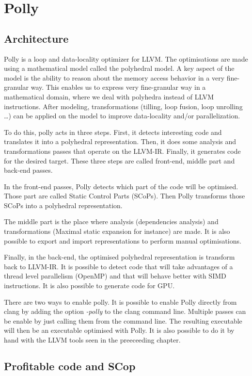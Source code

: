 \chapter{Polly}\label{ch:Polly}

\section{Architecture}
Polly is a loop and data-locality optimizer for LLVM. The optimisations are made using a mathematical model called the polyhedral model. A key aspect of the model is the ability to reason about the memory access behavior in a very fine-granular way. This enables us to express very fine-granular way in a mathematical domain, where we deal with polyhedra instead of LLVM instructions. After modeling, transformations (tilling, loop fusion, loop unrolling …) can be applied on the model to improve data-locality and/or parallelization.

To do this, polly acts in three steps. First, it detects interesting code and translates it into a polyhedral representation. Then, it does some analysis and transformations passes that operate on the LLVM-IR. Finally, it generates code for the desired target. These three steps are called front-end, middle part and back-end passes.


In the front-end passes, Polly detects which part of the code will be optimised. Those part are called Static Control Parts (SCoPs). Then Polly transforms those SCoPs into a polyhedral representation. 

The middle part is the place where analysis (dependencies analysis) and transformations (Maximal static expansion for instance) are made. It is also possible to export and import representations to perform manual optimisations.

Finally, in the back-end, the optimised polyhedral representation is transform back to LLVM-IR. It is possible to detect code that will take advantages of a thread level parallelism (OpenMP) and that will behave better with SIMD instructions. It is also possible to generate code for GPU. 

There are two ways to enable polly. It is possible to enable Polly directly from clang by adding the option \emph{-polly} to the clang command line. Multiple passes can be enable by just calling them from the command line. The resulting executable will then be an executable optimised with Polly. It is also possible to do it by hand with the LLVM tools seen in the preeceeding chapter.

\section{Profitable code and SCop}
